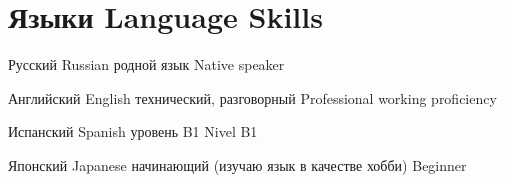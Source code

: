 \section
  {\lang
    {Языки}
    {Language Skills}}

\cvitem
  {\lang
    {Русский}
    {Russian}}
  {\lang
    {родной язык}
    {Native speaker}}

\cvitem
  {\lang
    {Английский}
    {English}}
  {\lang
    {технический, разговорный}
    {Professional working proficiency}}

\cvitem
  {\lang
    {Испанский}
    {Spanish}}
  {\lang
    {уровень B1}
    {Nivel B1}}

\cvitem
  {\lang
    {Японский}
    {Japanese}}
  {\lang
    {начинающий (изучаю язык в качестве хобби)}
    {Beginner}}
